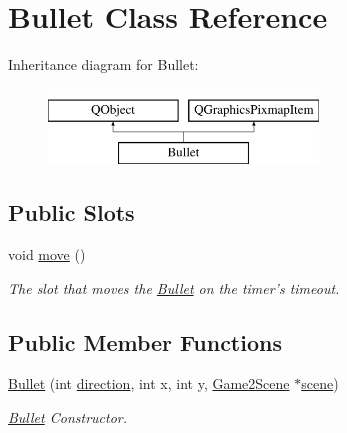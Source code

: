 \hypertarget{classBullet}{\section{Bullet Class Reference}
\label{classBullet}
}
Inheritance diagram for Bullet\-:\begin{figure}[H]
\begin{center}
\leavevmode
\includegraphics[height=2.000000cm]{classBullet}
\end{center}
\end{figure}
\subsection*{Public Slots}
\begin{DoxyCompactItemize}
\item 
\hypertarget{classBullet_a6140db968c42c05e829e142f74f20b16}{void \hyperlink{classBullet_a6140db968c42c05e829e142f74f20b16}{move} ()}\label{classBullet_a6140db968c42c05e829e142f74f20b16}

\begin{DoxyCompactList}\small\item\em The slot that moves the \hyperlink{classBullet}{Bullet} on the timer's timeout. \end{DoxyCompactList}\end{DoxyCompactItemize}
\subsection*{Public Member Functions}
\begin{DoxyCompactItemize}
\item 
\hypertarget{classBullet_a2c017a5fb7e34d169e26b2cfdd1bed28}{\hyperlink{classBullet_a2c017a5fb7e34d169e26b2cfdd1bed28}{Bullet} (int \hyperlink{classBullet_a368daaff6965adc373d8fec654e29ef0}{direction}, int x, int y, \hyperlink{classGame2Scene}{Game2\-Scene} $\ast$\hyperlink{classBullet_aeadd62cc1ee5aa7ce5fecdbe1f8685ed}{scene})}\label{classBullet_a2c017a5fb7e34d169e26b2cfdd1bed28}

\begin{DoxyCompactList}\small\item\em \hyperlink{classBullet}{Bullet} Constructor. \end{DoxyCompactList}\end{DoxyCompactItemize}

